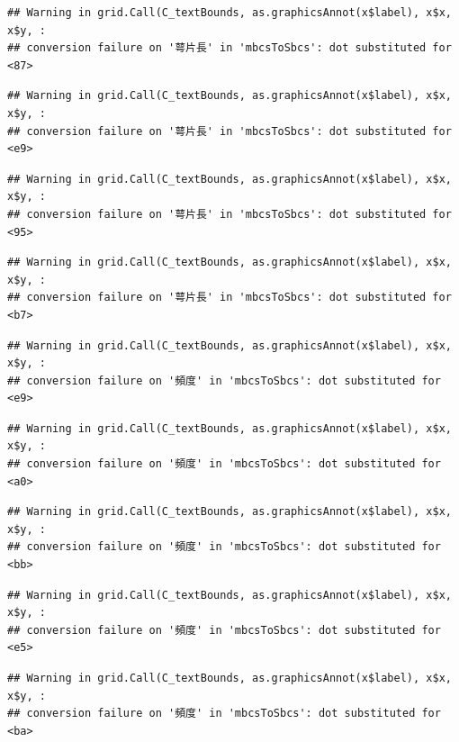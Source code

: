 \documentclass[
]{book}
\begin{document}
\begin{verbatim}
## Warning in grid.Call(C_textBounds, as.graphicsAnnot(x$label), x$x, x$y, :
## conversion failure on '萼片長' in 'mbcsToSbcs': dot substituted for <87>
\end{verbatim}

\begin{verbatim}
## Warning in grid.Call(C_textBounds, as.graphicsAnnot(x$label), x$x, x$y, :
## conversion failure on '萼片長' in 'mbcsToSbcs': dot substituted for <e9>
\end{verbatim}

\begin{verbatim}
## Warning in grid.Call(C_textBounds, as.graphicsAnnot(x$label), x$x, x$y, :
## conversion failure on '萼片長' in 'mbcsToSbcs': dot substituted for <95>
\end{verbatim}

\begin{verbatim}
## Warning in grid.Call(C_textBounds, as.graphicsAnnot(x$label), x$x, x$y, :
## conversion failure on '萼片長' in 'mbcsToSbcs': dot substituted for <b7>
\end{verbatim}

\begin{verbatim}
## Warning in grid.Call(C_textBounds, as.graphicsAnnot(x$label), x$x, x$y, :
## conversion failure on '頻度' in 'mbcsToSbcs': dot substituted for <e9>
\end{verbatim}

\begin{verbatim}
## Warning in grid.Call(C_textBounds, as.graphicsAnnot(x$label), x$x, x$y, :
## conversion failure on '頻度' in 'mbcsToSbcs': dot substituted for <a0>
\end{verbatim}

\begin{verbatim}
## Warning in grid.Call(C_textBounds, as.graphicsAnnot(x$label), x$x, x$y, :
## conversion failure on '頻度' in 'mbcsToSbcs': dot substituted for <bb>
\end{verbatim}

\begin{verbatim}
## Warning in grid.Call(C_textBounds, as.graphicsAnnot(x$label), x$x, x$y, :
## conversion failure on '頻度' in 'mbcsToSbcs': dot substituted for <e5>
\end{verbatim}

\begin{verbatim}
## Warning in grid.Call(C_textBounds, as.graphicsAnnot(x$label), x$x, x$y, :
## conversion failure on '頻度' in 'mbcsToSbcs': dot substituted for <ba>
\end{verbatim}
\end{document}
